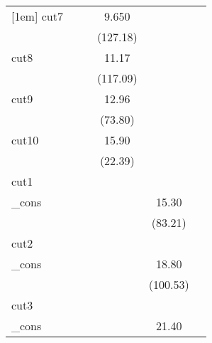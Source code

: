 {\begin{tabular}{l*{5}{c}}
[1em]
cut7        &                     &                     &       9.650\sym{***}&                     &                     \\
            &                     &                     &    (127.18)         &                     &                     \\
[1em]
cut8        &                     &                     &       11.17\sym{***}&                     &                     \\
            &                     &                     &    (117.09)         &                     &                     \\
[1em]
cut9        &                     &                     &       12.96\sym{***}&                     &                     \\
            &                     &                     &     (73.80)         &                     &                     \\
[1em]
cut10       &                     &                     &       15.90\sym{***}&                     &                     \\
            &                     &                     &     (22.39)         &                     &                     \\
\hline
cut1        &                     &                     &                     &                     &                     \\
\_cons      &                     &                     &                     &       15.30\sym{***}&                     \\
            &                     &                     &                     &     (83.21)         &                     \\
\hline
cut2        &                     &                     &                     &                     &                     \\
\_cons      &                     &                     &                     &       18.80\sym{***}&                     \\
            &                     &                     &                     &    (100.53)         &                     \\
\hline
cut3        &                     &                     &                     &                     &                     \\
\_cons      &                     &                     &                     &       21.40\sym{***}&                     \\

\end{tabular}}
